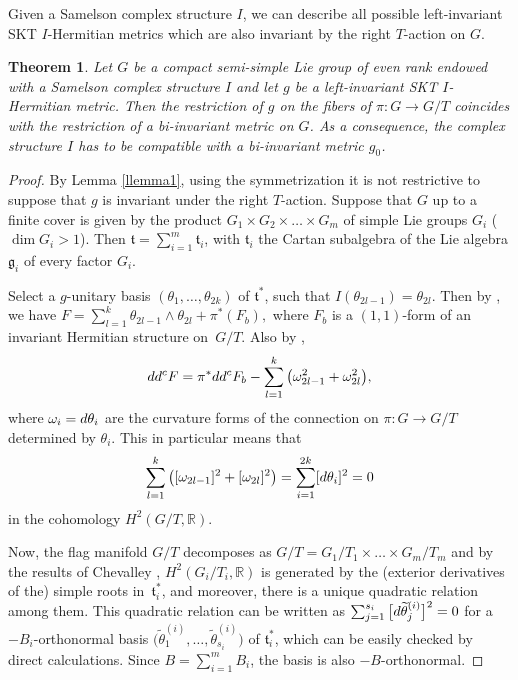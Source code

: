 \documentclass[11pt]{article}
\numberwithin{equation}{section}
\numberwithin{equation}{section}
\newtheorem{Theorem}{Theorem}[section]
\begin{document}
Given a Samelson complex structure $I$, we can describe all possible left-invariant SKT $I$-Hermitian metrics which are also invariant by the right $T$-action on $G$.

\begin{Theorem}\label{lemma2}
Let $G$ be a compact semi-simple Lie group of even rank endowed with a Samelson complex structure $I$ and let $g$ be a left-invariant SKT $I$-Hermitian metric.
Then the restriction of $g$ on the fibers of $\pi\colon G \rightarrow G/T$ coincides with the restriction of a bi-invariant metric on $G$. As a consequence, the complex structure $I$ has to be compatible with a bi-invariant metric $g_0$.
\end{Theorem}

\begin{proof} By Lemma \ref{llemma1}, using the symmetrization it is not restrictive to suppose that $g$ is invariant under the right $T$-action.
 Suppose that $G$ up to a finite cover is given by the product $G_1\times G_2\times \dots \times G_m$ of simple Lie groups $G_i$ ($ \dim G_i > 1$). Then $\mathfrak t = \sum_{i = 1}^m \mathfrak t_i$, with $\mathfrak t_i$ the Cartan subalgebra of the Lie algebra $\mathfrak g_i$ of every factor $G_i$.


Select a $g$-unitary basis $(\theta_1, \dots , \theta_{2k})$ of $\mathfrak t^*$, such that $ I(\theta_{2l-1})=\theta_{2l}$.
Then by \cite{GGP}, we have $F = \sum_{l = 1}^k \theta_{2l-1}\wedge\theta_{2l} + \pi^*(F_b),$ where $F_b$ is a $(1,1)$-form of an invariant Hermitian structure on~$G/T$. Also by \cite[Section~5]{GGP},
\[
{\rm d}{\rm d}^{\rm c} F = \pi^*{\rm d}{\rm d}^{\rm c} F_b - \sum_{l = 1}^k \big(\omega_{2l-1}^2+\omega_{2l}^2\big),
\]
 where $\omega_i = {\rm d}\theta_i$ are the curvature forms of the connection on $\pi\colon G\rightarrow G/T$ determined by $\theta_i$. This in particular means that
 \[
 \sum_{l=1}^k \big([\omega_{2l-1}]^2+[\omega_{2l}]^2\big) = \sum_{i=1}^{2k} [{\rm d}\theta_i]^2 = 0
 \]
 in the cohomology $H^2(G/T, \mathbb{R})$.

Now, the flag manifold $G/T$ decomposes as $G/T = G_1/T_1\times\dots \times G_m/T_m$ and by the results of Chevalley \cite{Chevalley}, $H^2(G_i/T_i, \mathbb{R})$ is generated by the (exterior derivatives of the) simple roots in~$\mathfrak t_i^*$, and moreover, there is a unique quadratic relation among them. This quadratic relation can be written as $\sum_{j=1}^{s_i} \big[{\rm d}\widetilde{\theta}^{(i)}_j\big]^2 = 0$ for
a $-B_i$-orthonormal basis $\big(\widetilde{\theta}^{(i)}_1, \dots, \widetilde{\theta}^{(i)}_{s_i}\big)$ of $\mathfrak t_i^*$, which can be easily checked by direct calculations. Since $B =\sum_{i =1}^m B_i$, the basis is also $-B$-orthonormal.


\end{proof}
\end{document}
